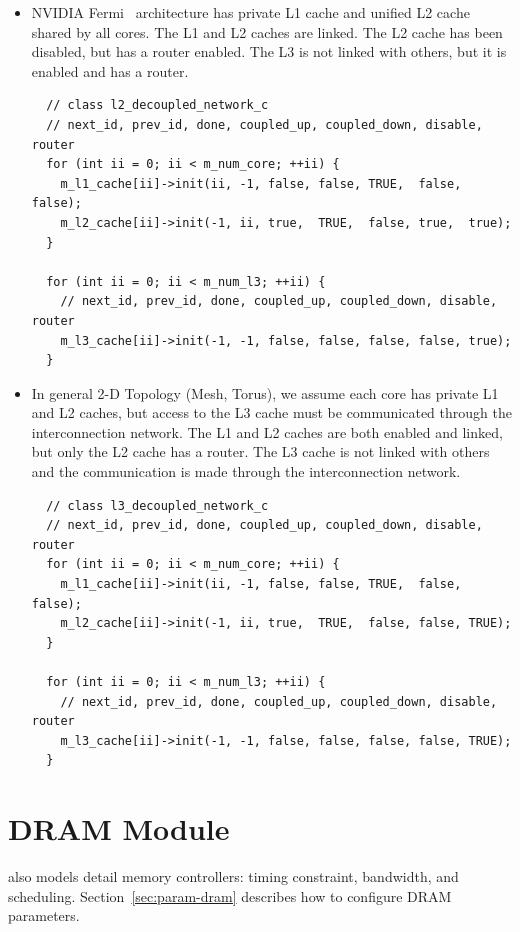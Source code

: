 \begin{itemize}
  \item NVIDIA Fermi~\cite{fermi} architecture has private L1 cache
  and unified L2 cache shared by all cores. The L1 and L2 caches are
  linked. The L2 cache has been disabled, but has a router
  enabled. The L3 is not linked with others, but it is enabled and has
  a router.

  \begin{Verbatim}
  // class l2_decoupled_network_c
  // next_id, prev_id, done, coupled_up, coupled_down, disable, router
  for (int ii = 0; ii < m_num_core; ++ii) {
    m_l1_cache[ii]->init(ii, -1, false, false, TRUE,  false, false);
    m_l2_cache[ii]->init(-1, ii, true,  TRUE,  false, true,  true);
  }

  for (int ii = 0; ii < m_num_l3; ++ii) {
    // next_id, prev_id, done, coupled_up, coupled_down, disable, router
    m_l3_cache[ii]->init(-1, -1, false, false, false, false, true);
  }
  \end{Verbatim}
  
  \item In general 2-D Topology (Mesh, Torus), we assume each core has
  private L1 and L2 caches, but access to the L3 cache must be
  communicated through the interconnection network. The L1 and L2
  caches are both enabled and linked, but only the L2 cache has a
  router. The L3 cache is not linked with others and the communication
  is made through the interconnection network.

  \begin{Verbatim}
  // class l3_decoupled_network_c
  // next_id, prev_id, done, coupled_up, coupled_down, disable, router
  for (int ii = 0; ii < m_num_core; ++ii) {
    m_l1_cache[ii]->init(ii, -1, false, false, TRUE,  false, false);
    m_l2_cache[ii]->init(-1, ii, true,  TRUE,  false, false, TRUE);
  }

  for (int ii = 0; ii < m_num_l3; ++ii) {
    // next_id, prev_id, done, coupled_up, coupled_down, disable, router
    m_l3_cache[ii]->init(-1, -1, false, false, false, false, TRUE);
  }
  \end{Verbatim}
\end{itemize}

\section{DRAM Module} 

\SIM also models detail memory controllers: timing constraint, 
bandwidth, and scheduling. Section~\ref{sec:param-dram} describes how
to configure DRAM parameters.

